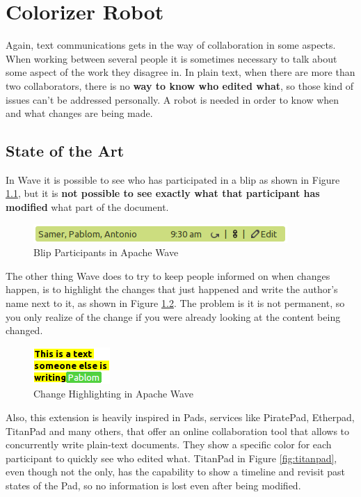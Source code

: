 \thispagestyle{sectioned}
\chapter{Colorizer Robot}
Again, text communications gets in the way of collaboration in some aspects. When working between several people it is sometimes necessary to talk about some aspect of the work they disagree in. In plain text, when there are more than two collaborators, there is no \textbf{way to know who edited what}, so those kind of issues can't be addressed personally. A robot is needed in order to know when and what changes are being made.

\label{subsec:color_soa}
\section{State of the Art}
In Wave it is possible to see who has participated in a blip as shown in Figure \ref{fig:participants}, but it is \textbf{not possible to see exactly what that participant has modified} what part of the document.
\begin{figure}[H]
  \center
    \includegraphics[keepaspectratio, scale=0.7]{Media/Captures/Wave/Participants.png}
  \caption{Blip Participants in Apache Wave}
  \label{fig:participants}
\end{figure}
The other thing Wave does to try to keep people informed on when changes happen, is to highlight the changes that just happened and write the author's name next to it, as shown in Figure \ref{fig:participants2}. The problem is it is not permanent, so you only realize of the change if you were already looking at the content being changed.
\begin{figure}[H]
  \center
    \includegraphics[keepaspectratio, scale=0.7]{Media/Captures/Wave/Participants2.png}
  \caption{Change Highlighting in Apache Wave}
  \label{fig:participants2}
\end{figure}
Also, this extension is heavily inspired in Pads, services like PiratePad, Etherpad, TitanPad and many others, that offer an online collaboration tool that allows to concurrently write plain-text documents. They show a specific color for each participant to quickly see who edited what. TitanPad in Figure \ref{fig:titanpad}, even though not the only, has the capability to show a timeline and revisit past states of the Pad, so no information is lost even after being modified.
